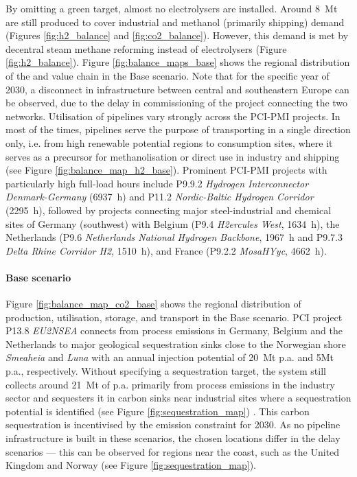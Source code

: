 \documentclass[final,5p,times,twocolumn]{elsarticle}
\let\autocite\cite
\begin{document}
By omitting a green  target, almost no electrolysers are installed. Around \SI{8}{Mt} are still produced to cover industrial  and methanol (primarily shipping) demand (Figures \ref{fig:h2_balance} and \ref{fig:co2_balance}). However, this demand is met by decentral steam methane reforming instead of electrolysers (Figure \ref{fig:h2_balance}). 
Figure \ref{fig:balance_maps_base} shows the regional distribution of the  and  value chain in the Base scenario. Note that for the specific year of 2030, a disconnect in  infrastructure between central and southeastern Europe can be observed, due to the delay in commissioning of the project connecting the two networks. Utilisation of  pipelines vary strongly across the PCI-PMI projects. In most of the times, pipelines serve the purpose of transporting  in a single direction only, i.e. from high renewable potential regions to  consumption sites, where it serves as a precursor for methanolisation or direct use in industry and shipping (see Figure \ref{fig:balance_map_h2_base}). Prominent PCI-PMI projects with particularly high full-load hours include P9.9.2 \textit{Hydrogen Interconnector Denmark-Germany} (\SI{6937}{h}) and P11.2  \textit{Nordic-Baltic Hydrogen Corridor} (\SI{2295}{h}), followed by projects connecting major steel-industrial and chemical sites of Germany (southwest) with Belgium (P9.4 \textit{H2ercules West}, \SI{1634}{h}), the Netherlands (P9.6 \textit{Netherlands National Hydrogen Backbone}, \SI{1967}{h} and P9.7.3 \textit{Delta Rhine Corridor H2}, \SI{1510}{h}), and France (P9.2.2 \textit{MosaHYyc}, \SI{4662}{h}).

\paragraph{Base scenario} Figure \ref{fig:balance_map_co2_base} shows the regional distribution of  production, utilisation, storage, and transport in the Base scenario. PCI project P13.8 \textit{EU2NSEA} connects  from process emissions in Germany, Belgium and the Netherlands to major geological sequestration sinks close to the Norwegian shore \textit{Smeaheia} and \textit{Luna} with an annual injection potential of \SI{20}{Mt} p.a. and {5}{Mt} p.a., respectively. 
Without specifying a  sequestration target, the system still collects around \SI{21}{Mt} of  p.a. primarily from process emissions in the industry sector and sequesters it in carbon sinks near industrial sites where a sequestration potential is identified (see Figure \ref{fig:sequestration_map}) \autocite{hofmannH2CO2Network2024}. This carbon sequestration is incentivised by the emission constraint for 2030. As no pipeline infrastructure is built in these scenarios, the chosen locations differ in the delay scenarios --- this can be observed for regions near the coast, such as the United Kingdom and Norway (see Figure \ref{fig:sequestration_map}).
\end{document}
